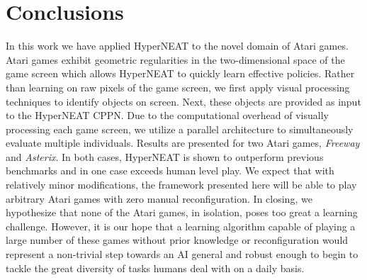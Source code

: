 \documentclass{acm_proc_article-sp}
\begin{document}
\section{Conclusions}
\label{sec:conclusion}
In this work we have applied HyperNEAT to the novel domain of Atari games. Atari games exhibit geometric regularities in the two-dimensional space of the game screen which allows HyperNEAT to quickly learn effective policies. Rather than learning on raw pixels of the game screen, we first apply visual processing techniques to identify objects on screen. Next, these objects are provided as input to the HyperNEAT CPPN. Due to the computational overhead of visually processing each game screen, we utilize a parallel architecture to simultaneously evaluate multiple individuals. Results are presented for two Atari games, \textit{Freeway} and \textit{Asterix}. In both cases, HyperNEAT is shown to outperform previous benchmarks\cite{naddaf10} and in one case exceeds human level play. We expect that with relatively minor modifications, the framework presented here will be able to play arbitrary Atari games with zero manual reconfiguration. In closing, we hypothesize that none of the Atari games, in isolation, poses too great a learning challenge. However, it is our hope that a learning algorithm capable of playing a large number of these games without prior knowledge or reconfiguration would represent a non-trivial step towards an AI general and robust enough to begin to tackle the great diversity of tasks humans deal with on a daily basis.



%

\end{document}
